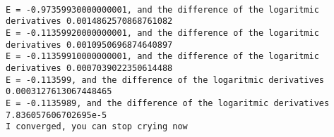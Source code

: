 \documentclass[10pt]{article}
\begin{document}
    \begin{center}
    \end{center}
    { \hspace*{\fill} \\}

    \begin{Verbatim}[commandchars=\\\{\}]
E = -0.97359930000000001, and the difference of the logaritmic derivatives 0.0014862570868761082
E = -0.11359920000000001, and the difference of the logaritmic derivatives 0.0010950696874640897
E = -0.11359910000000001, and the difference of the logaritmic derivatives 0.0007039022350614488
E = -0.113599, and the difference of the logaritmic derivatives 0.0003127613067448465
E = -0.1135989, and the difference of the logaritmic derivatives 7.836057606702695e-5
I converged, you can stop crying now

    \end{Verbatim}
\end{document}
